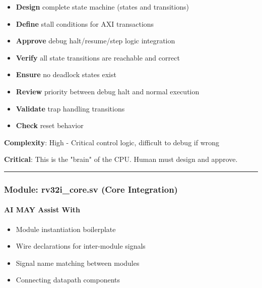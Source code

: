 \begin{record}

\begin{itemize}
\tightlist
\item
  \textbf{Design} complete state machine (states and transitions)
\item
  \textbf{Define} stall conditions for AXI transactions
\item
  \textbf{Approve} debug halt/\allowbreak{}resume/\allowbreak{}step
  logic integration
\item
  \textbf{Verify} all state transitions are reachable and correct
\item
  \textbf{Ensure} no deadlock states exist
\item
  \textbf{Review} priority between debug halt and normal execution
\item
  \textbf{Validate} trap handling transitions
\item
  \textbf{Check} reset behavior
\end{itemize}

\textbf{Complexity}: \bad{} High - Critical control logic, difficult to
debug if wrong

\textbf{Critical}: This is the "brain" of the CPU. Human must design and
approve.

\begin{center}\rule{0.5\linewidth}{0.5pt}\end{center}

\end{record}

\subsubsection{\texorpdfstring{Module: rv32i\_\allowbreak{}core.sv (Core
Integration)}{Module: rv32i\_core.sv (Core Integration)}}\label{cr:status:phase1-ai-human-responsibilities:module-rv32i-coresv-core-integration}

\paragraph{\texorpdfstring{\ok{} AI MAY Assist
With}{ AI MAY Assist With}}\label{cr:status:phase1-ai-human-responsibilities:white-check-mark-ai-may-assist-with-5}

\begin{record}

\begin{itemize}
\tightlist
\item
  Module instantiation boilerplate
\item
  Wire declarations for inter-module signals
\item
  Signal name matching between modules
\item
  Connecting datapath components
\end{itemize}

\end{record}

